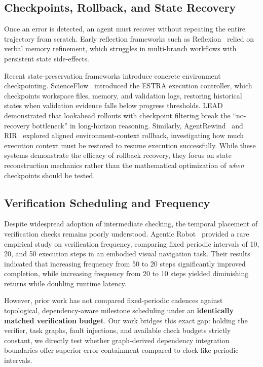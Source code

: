 \subsection{Checkpoints, Rollback, and State Recovery}
Once an error is detected, an agent must recover without repeating the entire trajectory from scratch. Early reflection frameworks such as Reflexion~\citep{shinn2023reflexion} relied on verbal memory refinement, which struggles in multi-branch workflows with persistent state side-effects. 

Recent state-preservation frameworks introduce concrete environment checkpointing. ScienceFlow~\citep{zhao2026scienceflow} introduced the ESTRA execution controller, which checkpoints workspace files, memory, and validation logs, restoring historical states when validation evidence falls below progress thresholds. LEAD~\citep{pushkin2026lead} demonstrated that lookahead rollouts with checkpoint filtering break the ``no-recovery bottleneck'' in long-horizon reasoning. Similarly, AgentRewind~\citep{zhuang2026agentrewind} and RIR~\citep{yu2026rir} explored aligned environment-context rollback, investigating how much execution context must be restored to resume execution successfully. While these systems demonstrate the efficacy of rollback recovery, they focus on state reconstruction mechanics rather than the mathematical optimization of \emph{when} checkpoints should be tested.

\subsection{Verification Scheduling and Frequency}
Despite widespread adoption of intermediate checking, the temporal placement of verification checks remains poorly understood. Agentic Robot~\citep{yang2025agenticrobot} provided a rare empirical study on verification frequency, comparing fixed periodic intervals of 10, 20, and 50 execution steps in an embodied visual navigation task. Their results indicated that increasing frequency from 50 to 20 steps significantly improved completion, while increasing frequency from 20 to 10 steps yielded diminishing returns while doubling runtime latency. 

However, prior work has not compared fixed-periodic cadences against topological, dependency-aware milestone scheduling under an \textbf{identically matched verification budget}. Our work bridges this exact gap: holding the verifier, task graphs, fault injections, and available check budgets strictly constant, we directly test whether graph-derived dependency integration boundaries offer superior error containment compared to clock-like periodic intervals.
